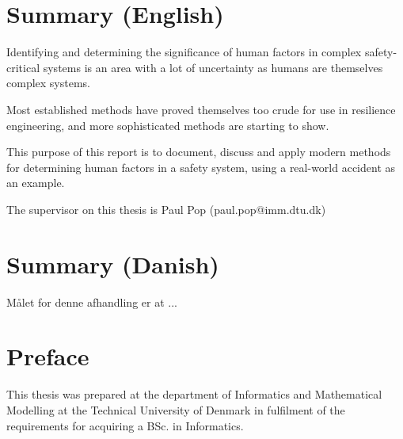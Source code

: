 \documentclass[10pt,oneside]{book}                  %
\begin{document}
\prefrontmatter
\frontmatter



\chapter{Summary (English)}
Identifying and determining the significance of human factors in complex safety-critical systems is an area with a lot of uncertainty as humans are themselves complex systems.

Most established methods have proved themselves too crude for use in resilience engineering, and more sophisticated methods are starting to show.

This purpose of this report is to document, discuss and apply modern methods for determining human factors in a safety system, using a real-world accident as an example.


The supervisor on this thesis is Paul Pop (paul.pop@imm.dtu.dk)

\markboth{}{}                                       %
\chapter{Summary (Danish)}

Målet for denne afhandling er at ...

\markboth{}{}                                       %

\chapter{Preface}

This thesis was prepared at the department of Informatics and Mathematical Modelling at the Technical University of Denmark in fulfilment of the requirements for acquiring a BSc. in Informatics. 
\end{document}
